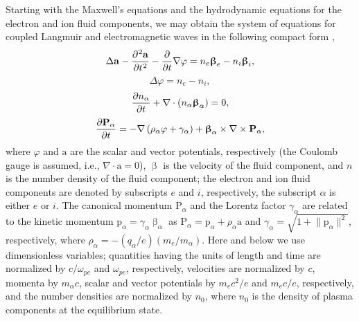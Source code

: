 \documentclass[10pt, a4paper, twoside, openright]{report}
\newcommand{\norm}[1]{\lVert#1\rVert}
\renewcommand{\vec}[1]{\boldsymbol{\mathrm{#1}}}
\newcommand{\rot}[1]{\nabla \times #1}
\newcommand{\grad}[1]{\nabla #1}
\renewcommand{\div}[1]{\nabla \cdot #1}
\newcommand{\laplace}[1]{\Delta #1}
\begin{document}
Starting with the Maxwell's equations and the hydrodynamic equations for the electron and ion fluid components, we may obtain the system of equations for coupled Langmuir and electromagnetic waves in the following compact form \cite{Farina2001, Bulanov2013, Bulanov2021},
\begin{equation}\label{eq:eq_for_vector_potential}
\laplace{\vec{a}} - \diffp[2]{\vec{a}}{t} - \diffp{}{t} \grad{\varphi} = n_e \vec{\upbeta}_e - n_i \vec{\upbeta}_i,
\end{equation}
\begin{equation}\label{eq:eq_for_scalar_potential}
\laplace{\varphi} = n_e - n_i,
\end{equation}
\begin{equation}\label{eq:eq_for_density}
\diffp{n_{\alpha}}{t} +  \div{ \left( n_{\alpha} \vec{\upbeta}_{\alpha} \right) } = 0,
\end{equation}
\begin{equation}\label{eq:eq_for_momentum}
\diffp{\vec{P}_{\alpha}}{t} = - \grad{\left( \rho_{\alpha} \varphi + \gamma_{\alpha} \right)} + \vec{\upbeta}_{\alpha} \times \rot{\vec{P}_{\alpha}},
\end{equation}
where $ \varphi $ and $ \vec{a} $ are the scalar and vector potentials, respectively (the Coulomb gauge is assumed, i.e., $ \div{\vec{a}} = 0 $), $ \vec{\upbeta} $ is the velocity of the fluid component, and $ n $ is the number density of the fluid component; the electron and ion fluid components are denoted by subscripts $ e $ and $ i $, respectively, the subscript $ \alpha $ is either $ e $ or $ i $. The canonical momentum $ \vec{P}_{\alpha} $ and the Lorentz factor $ \gamma_{\alpha} $ are related to the kinetic momentum $ \vec{p}_{\alpha} = \gamma_{\alpha} \vec{\upbeta}_{\alpha} $ as $ \vec{P}_{\alpha} = \vec{p}_{\alpha} + \rho_{\alpha} \vec{a} $ and $ \gamma_{\alpha} = \sqrt{1 + \norm{\vec{p}_{\alpha}}^2} $, respectively, where $ \rho_{\alpha} = - \left( q_{\alpha} / e \right) \left( m_e / m_{\alpha} \right) $. Here and below we use dimensionless variables; quantities having the units of length and time are normalized by $ c / \omega_{pe} $ and $ \omega_{pe} $, respectively, velocities are normalized by $ c $, momenta by $ m_{\alpha} c $, scalar and vector potentials by $ m_e c^2 / e $ and $ m_e c / e $, respectively, and the number densities are normalized by $ n_0 $, where $ n_0 $ is the density of plasma components at the equilibrium state.
\end{document}
